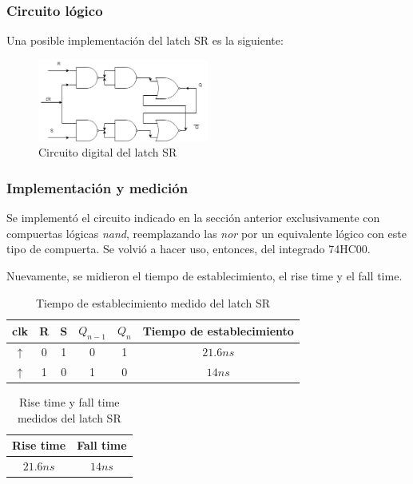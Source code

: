\documentclass[../../e3_tp2_main.tex]{subfiles}
\begin{document}
\subsubsection{Circuito lógico}
Una posible implementación del latch SR es la siguiente:
\begin{figure}[H]	
	\centering
	\includegraphics[width=0.5\textwidth]{imagenes/lsr_cd.png}
	\caption{Circuito digital del latch SR}
\end{figure}

\subsubsection{Implementación y medici\'on}
Se implementó el circuito indicado en la sección anterior exclusivamente con compuertas lógicas \textit{nand}, reemplazando las \textit{nor} por un equivalente l\'ogico con este tipo de compuerta. Se volvi\'o a hacer uso, entonces, del integrado 74HC00.\par

Nuevamente, se midieron el tiempo de establecimiento, el rise time y el fall time. 

\begin{table}[H]
\begin{center}
\begin{tabular}{|c|c|c|c|c|c|}
\hline
clk& R&S & $Q_{n-1}$ & $Q_n$ &Tiempo de establecimiento\\
\hline \hline
$\uparrow$ &0 & 1 &0&1&$21.6 n s$  \\ \hline
$\uparrow$ &1 & 0 &1&0&$14 n s$  \\ \hline

\end{tabular}
\caption{Tiempo de establecimiento medido del latch SR} 
\end{center}
\end{table}

\begin{table}[H]
\begin{center}
\begin{tabular}{|c|c|}
\hline
Rise time& Fall time \\
\hline \hline
$21.6 n s$  & $14 n s$ \\ \hline
\end{tabular}
\caption{Rise time y fall time medidos del latch SR} 
\end{center}
\end{table}
\end{document}
